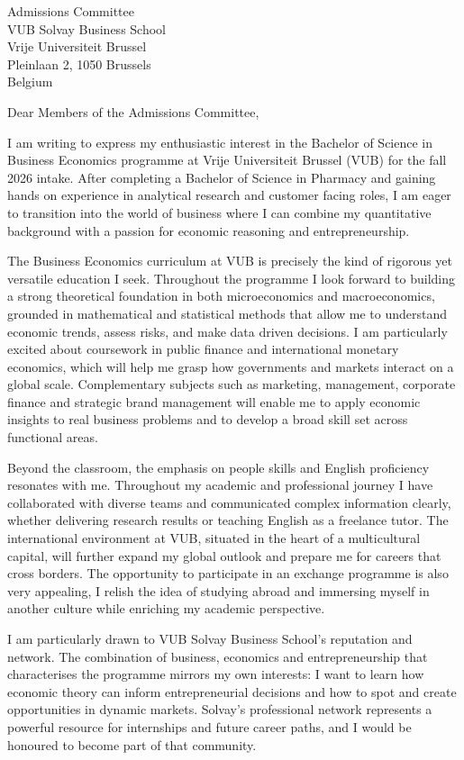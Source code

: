 \documentclass[11pt,a4paper]{letter}
\date{March 10, 2026}
\begin{document}
\begin{letter}{Admissions Committee \\ VUB Solvay Business School \\ Vrije Universiteit Brussel \\ Pleinlaan 2, 1050 Brussels \\ Belgium}

\opening{Dear Members of the Admissions Committee,}

I am writing to express my enthusiastic interest in the Bachelor of Science in Business Economics programme at Vrije Universiteit Brussel (VUB) for the fall 2026 intake. After completing a Bachelor of Science in Pharmacy and gaining hands on experience in analytical research and customer facing roles, I am eager to transition into the world of business where I can combine my quantitative background with a passion for economic reasoning and entrepreneurship.

The Business Economics curriculum at VUB is precisely the kind of rigorous yet versatile education I seek. Throughout the programme I look forward to building a strong theoretical foundation in both microeconomics and macroeconomics, grounded in mathematical and statistical methods that allow me to understand economic trends, assess risks, and make data driven decisions. I am particularly excited about coursework in public finance and international monetary economics, which will help me grasp how governments and markets interact on a global scale. Complementary subjects such as marketing, management, corporate finance and strategic brand management will enable me to apply economic insights to real business problems and to develop a broad skill set across functional areas.

Beyond the classroom, the emphasis on people skills and English proficiency resonates with me. Throughout my academic and professional journey I have collaborated with diverse teams and communicated complex information clearly, whether delivering research results or teaching English as a freelance tutor. The international environment at VUB, situated in the heart of a multicultural capital, will further expand my global outlook and prepare me for careers that cross borders. The opportunity to participate in an exchange programme is also very appealing, I relish the idea of studying abroad and immersing myself in another culture while enriching my academic perspective.

I am particularly drawn to VUB Solvay Business School's reputation and network. The combination of business, economics and entrepreneurship that characterises the programme mirrors my own interests: I want to learn how economic theory can inform entrepreneurial decisions and how to spot and create opportunities in dynamic markets. Solvay's professional network represents a powerful resource for internships and future career paths, and I would be honoured to become part of that community.


\end{letter}
\end{document}
